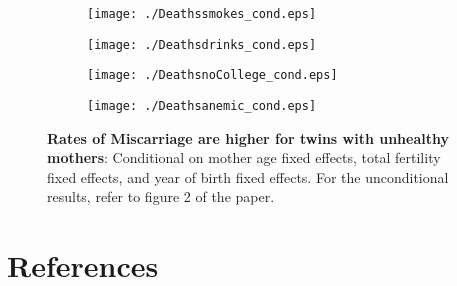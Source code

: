 \documentclass{nature}
\begin{document}
\begin{linenumbers}
\begin{spacing}{1}

\begin{figure}[htpb!]
\begin{subfigure}{.5\textwidth}
  \texttt{[image: ./Deathssmokes\_cond.eps]}
\end{subfigure}%
\begin{subfigure}{.5\textwidth}
  \texttt{[image: ./Deathsdrinks\_cond.eps]}
\end{subfigure}
\begin{subfigure}{.5\textwidth}
  \texttt{[image: ./DeathsnoCollege\_cond.eps]}
\end{subfigure}%
\begin{subfigure}{.5\textwidth}
  \texttt{[image: ./Deathsanemic\_cond.eps]}
\end{subfigure}
\vspace{5mm}
\caption{\textbf{Rates of Miscarriage are higher for twins with unhealthy mothers}: Conditional on mother age fixed effects, total fertility fixed effects, and year of birth fixed effects.  For the unconditional results, refer to figure 2 of the paper.}
\end{figure}
\end{spacing}

\clearpage
\begin{spacing}{1}

\begin{landscape}

\end{landscape}
\begin{landscape}

\end{landscape}
\end{spacing}



\clearpage
\section*{References}



\end{linenumbers}
\end{document}
